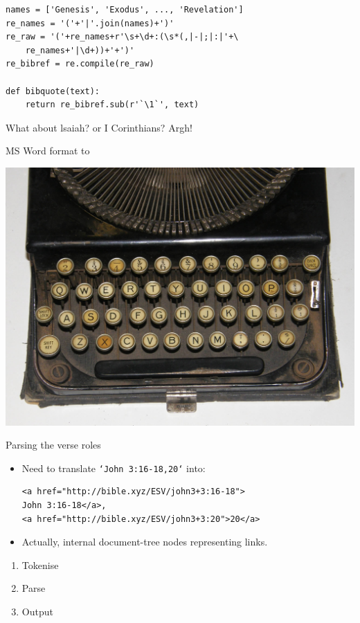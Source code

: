 \documentclass{beamer}
\begin{document}
\begin{frame}[fragile]
    
\begin{verbatim}
names = ['Genesis', 'Exodus', ..., 'Revelation']
re_names = '('+'|'.join(names)+')'
re_raw = '('+re_names+r'\s+\d+:(\s*(,|-|;|:|'+\
    re_names+'|\d+))+'+')'
re_bibref = re.compile(re_raw)

def bibquote(text):
    return re_bibref.sub(r'`\1`', text)
\end{verbatim}

What about lsaiah? or I Corinthians? Argh!

\end{frame}

\begin{frame}{MS Word format to \rst}
    \centerline{\includegraphics[keepaspectratio=true, width=\paperwidth]{typewriter_keyboard.jpg}}
\end{frame}

\begin{frame}[fragile]{Parsing the verse roles}
\begin{itemize}
\item Need to translate \texttt{`John 3:16-18,20`} into:

\begin{verbatim}
<a href="http://bible.xyz/ESV/john3+3:16-18">
John 3:16-18</a>,
<a href="http://bible.xyz/ESV/john3+3:20">20</a>
\end{verbatim}

\item Actually, internal document-tree nodes representing links.
\end{itemize}

\begin{enumerate}
\item Tokenise
\item Parse
\item Output
\end{enumerate}
\end{frame}
\end{document}
